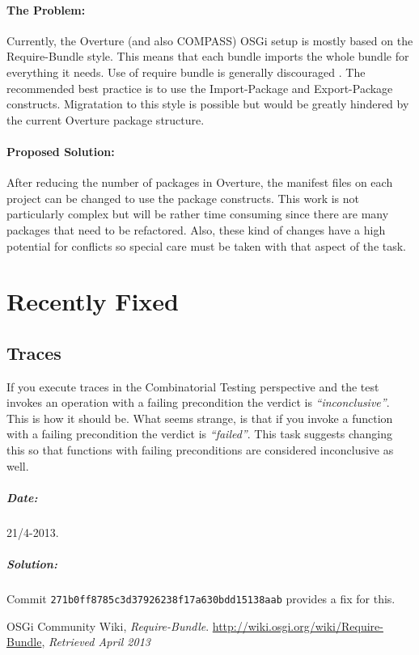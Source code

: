 \documentclass[11pt]{overturerep}
\begin{document}
\subsubsection{The Problem:} Currently, the Overture (and also COMPASS)
OSGi setup is mostly based on the \textsf{Require-Bundle} style. This means
that each bundle imports the whole bundle for everything it needs. Use of
require bundle is generally discouraged \cite{osgi2013}. The recommended
best practice is to use the \textsf{Import-Package} and
\textsf{Export-Package} constructs. Migratation to this style is possible
but would be greatly hindered by the current Overture package structure.


\subsubsection{Proposed Solution:} After reducing the number of packages in
Overture, the manifest files on each project can be changed to use the
package constructs. This work is not particularly complex but will be
rather time consuming since there are many packages that need to be
refactored. Also, these kind of changes have a high potential for conflicts
so special care must be taken with that aspect of the task.







\chapter{Recently Fixed}

\section{Traces}

If you execute traces in the Combinatorial Testing perspective and the test
invokes an operation with a failing precondition the verdict is
\textit{``inconclusive''}. This is how it should be. What seems strange, is
that if you invoke a function with a failing precondition the verdict is
\textit{``failed''}. This task suggests changing this so that functions with
failing preconditions are considered inconclusive as well.

\paragraph{Date:} 21/4-2013.

\paragraph{Solution:} Commit \texttt{271b0ff8785c3d37926238f17a630bdd15138aab}
provides a fix for this.



\begin{thebibliography}{9}

     OSGi Community Wiki, \emph{Require-Bundle}.
        \url{http://wiki.osgi.org/wiki/Require-Bundle}, \emph{Retrieved April 2013}

\end{thebibliography} 
\end{document}
